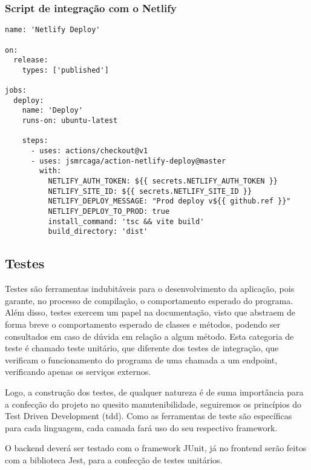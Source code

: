 \subsubsection{Script de integração com o Netlify}
\begin{verbatim}
name: 'Netlify Deploy'

on:
  release:
    types: ['published']

jobs:
  deploy:
    name: 'Deploy'
    runs-on: ubuntu-latest

    steps:
      - uses: actions/checkout@v1
      - uses: jsmrcaga/action-netlify-deploy@master
        with:
          NETLIFY_AUTH_TOKEN: ${{ secrets.NETLIFY_AUTH_TOKEN }}
          NETLIFY_SITE_ID: ${{ secrets.NETLIFY_SITE_ID }}
          NETLIFY_DEPLOY_MESSAGE: "Prod deploy v${{ github.ref }}"
          NETLIFY_DEPLOY_TO_PROD: true
          install_command: 'tsc && vite build'
          build_directory: 'dist'
\end{verbatim}


\subsection{Testes}
Testes são ferramentas indubitáveis para o desenvolvimento da aplicação, pois garante, no processo de compilação, o comportamento esperado do programa. Além disso, testes exercem um papel na documentação, visto que abstraem de forma breve o comportamento esperado de classes e métodos,
podendo ser consultados em caso de dúvida em relação a algum método. Esta categoria de teste é chamado teste unitário, que diferente dos testes de integração, que verificam o funcionamento do programa de uma chamada a um \gls{endpoint}, verificando apenas os serviços externos.

Logo, a construção dos testes, de qualquer natureza é de suma importância para a confecção do projeto no quesito manutenibilidade, seguiremos os princípios do Test Driven Development (\gls{tdd}). Como as ferramentas de teste são específicas para cada linguagem, cada camada fará uso do seu respectivo \gls{framework}.

O \gls{backend} deverá ser testado com o \gls{framework} JUnit, já no \gls{frontend} serão feitos com a biblioteca Jest, para a confecção de testes unitários.